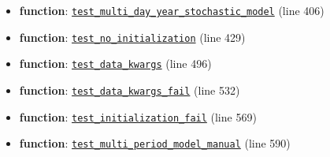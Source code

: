 \documentclass[11pt]{report}
\begin{document}
\begin{itemize}[leftmargin=*]
  \item \textbf{function}: \hyperref[def:multiperiod-tests-test_multiperiod.py:test_multi_day_year_stochastic_model:L406]{\texttt{test\_multi\_day\_year\_stochastic\_model}} (line 406)
  \item \textbf{function}: \hyperref[def:multiperiod-tests-test_multiperiod.py:test_no_initialization:L429]{\texttt{test\_no\_initialization}} (line 429)
  \item \textbf{function}: \hyperref[def:multiperiod-tests-test_multiperiod.py:test_data_kwargs:L496]{\texttt{test\_data\_kwargs}} (line 496)
  \item \textbf{function}: \hyperref[def:multiperiod-tests-test_multiperiod.py:test_data_kwargs_fail:L532]{\texttt{test\_data\_kwargs\_fail}} (line 532)
  \item \textbf{function}: \hyperref[def:multiperiod-tests-test_multiperiod.py:test_initialization_fail:L569]{\texttt{test\_initialization\_fail}} (line 569)
  \item \textbf{function}: \hyperref[def:multiperiod-tests-test_multiperiod.py:test_multi_period_model_manual:L590]{\texttt{test\_multi\_period\_model\_manual}} (line 590)
\end{itemize}
\end{document}
